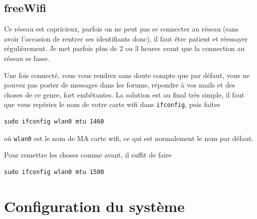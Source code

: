\documentclass[a4paper,twoside]{article}
\begin{document}
\subsection{freeWifi}
Ce réseau est capricieux, parfois on ne peut pas se connecter au réseau (sans avoir l'occasion de rentrer ses identifiants donc), il faut être patient et réessayer régulièrement. Je met parfois plus de 2 ou 3 heures avant que la connection au réseau se fasse.

Une fois connecté, vous vous rendrez sans doute compte que par défaut, vous ne pouvez pas poster de messages dans les forums, répondre à vos mails et des choses de ce genre, fort embêtantes. La solution est au final très simple, il faut que vous repériez le nom de votre carte wifi dans \verb|ifconfig|, puis faites
\begin{verbatim}
sudo ifconfig wlan0 mtu 1460
\end{verbatim}
où \texttt{wlan0} est le nom de MA carte wifi, ce qui est normalement le nom par défaut.

\bigskip

Pour remettre les choses comme avant, il suffit de faire
\begin{verbatim}
sudo ifconfig wlan0 mtu 1500
\end{verbatim}


\section{Configuration du système}
\end{document}
